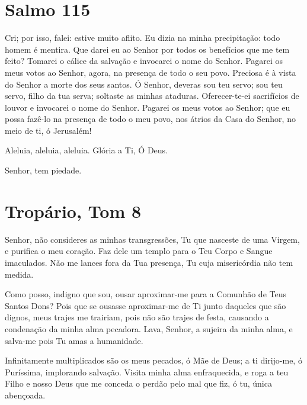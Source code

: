 \documentclass{subfiles}
\begin{document}
\section*{Salmo 115}

Cri; por isso, falei: estive muito aflito. Eu dizia na minha precipitação: todo
homem é mentira. Que darei eu ao Senhor por todos os benefícios que me tem
feito? Tomarei o cálice da salvação e invocarei o nome do Senhor. Pagarei os
meus votos ao Senhor, agora, na presença de todo o seu povo. Preciosa é à vista
do Senhor a morte dos seus santos. Ó Senhor, deveras sou teu servo; sou teu
servo, filho da tua serva; soltaste as minhas ataduras. Oferecer-te-ei
sacrifícios de louvor e invocarei o nome do Senhor. Pagarei os meus votos ao
Senhor; que eu possa fazê-lo na presença de todo o meu povo, nos átrios da Casa
do Senhor, no meio de ti, ó Jerusalém!


\Doxology{}

Aleluia, aleluia, aleluia. Glória a Ti, Ó Deus. 

Senhor, tem piedade. 

\section*{Tropário, Tom 8}

Senhor, não consideres as minhas transgressões, Tu que nasceste de uma Virgem, e
purifica o meu coração. Faz dele um templo para o Teu Corpo e Sangue imaculados.
Não me lances fora da Tua presença, Tu cuja misericórdia não tem medida.

\doxology{}

Como posso, indigno que sou, ousar aproximar-me para a Comunhão
de Teus Santos Dons? Pois que se ousasse aproximar-me de Ti junto daqueles
que são dignos, meus trajes me trairiam, pois não são trajes de festa, causando
a condenação da minha alma pecadora. Lava, Senhor, a sujeira da minha alma,
e salva-me pois Tu amas a humanidade.

\nowandever{}

Infinitamente multiplicados são os meus pecados, ó Mãe de Deus; a ti dirijo-me,
ó Puríssima, implorando salvação. Visita minha alma enfraquecida, e roga a teu
Filho e nosso Deus que me conceda o perdão pelo mal que fiz, ó tu, única
abençoada.

\end{document}
